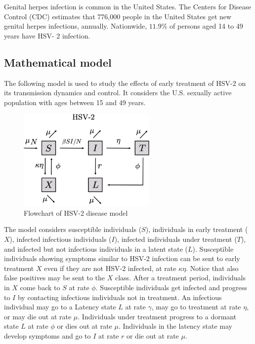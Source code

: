 \documentclass{book}
\begin{document}
Genital herpes infection is common in the United States. The Centers for Disease Control (CDC) estimates that 776,000 people in the United States get new genital herpes infections, annually. Nationwide, $11.9 \%$ of persons aged 14 to 49 years have HSV- 2 infection. 

\subsection*{Mathematical model}
The following model \cite{almonte2020cost} is used to study the effects of early treatment of HSV-2 on its transmission dynamics and control. It considers the U.S. sexually active population with ages between 15 and 49 years.
%

\begin{figure}[H]
    \centering
    \includegraphics[width = 0.6\textwidth]{Flowcharts/hsv-2.png}
    \caption{Flowchart of HSV-2 disease model}
    \label{fig:hsv2_flow}
\end{figure}

The model considers susceptible individuals ($S$), individuals in early treatment ($X$), infected infectious individuals ($I$), infected individuals under treatment ($T$), and infected but not infectious individuals in a latent state ($L$). Susceptible individuals showing symptoms similar to HSV-2 infection can be sent to early treatment $X$ even if they are not HSV-2 infected, at rate $\kappa \eta$. Notice that also false positives may be sent to the $X$ class. After a treatment period, individuals in $X$ come back to $S$ at rate $\phi$.
Susceptible individuals get infected and progress to $I$ by contacting infectious individuals not in treatment. An infectious individual may go to a Latency state $L$ at rate $\gamma$, may go to treatment at rate $\eta$, or may die out at rate $\mu$.
Individuals under treatment progress to a dormant state $L$ at rate $\phi$ or dies out at rate $\mu$. Individuals in the latency state may develop symptoms and go to $I$ at rate $r$ or die out at rate $\mu$.
\end{document}
